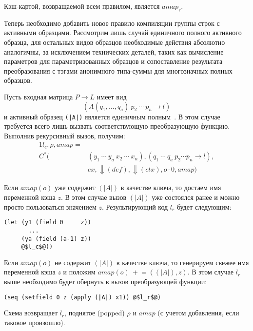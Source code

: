 Кэш-картой, возвращаемой всем правилом, является $amap_r$.

Теперь необходимо добавить новое правило компиляции группы строк с активными образцами. Рассмотрим лишь случай единичного полного активного образца, для остальных видов образцов необходимые действия абсолютно аналогичны, за исключением технических деталей, таких как вычисление параметров для параметризованных образцов и сопоставление результата преобразования с тэгами анонимного типа-суммы для многозначных полных образцов.

Пусть входная матрица $P \to L$ имеет вид 
\[
(A(q_1,\ldots,q_a)\ p_2\ \cdots\ p_n \to l)
\]
 и активный образец \lstinline{(|A|)} является единичным полным~\cite{syme2007extensible}. В этом случае требуется всего лишь вызвать соответствующую преобразующую функцию. Выполнив рекурсивный вызов, получим:
\begin{alignat*}{1}
l_c, \rho, amap = \\
C^*(&(y_1\ \cdots\ y_a\ x_2\ \cdots\ x_n), (q_1\ \cdots\ q_a\ p_2 \cdots p_n \to l),\\
&ex, \Downarrow(def), \Downarrow(ctx), o\cdot0, amap)
\end{alignat*}

Если $amap(o)$ уже содержит $(|A|)$ в качестве ключа, то достаем имя переменной кэша $z$. В этом случае вызов $(|A|)$ уже состоялся ранее и можно просто пользоваться значением $z$. Результирующий код $l_r$ будет следующим: 

\noindent
\begin{minipage}{\linewidth}
\begin{lstlisting}[language=lambda,escapechar=@] 
(let (y1 (field 0     z))
       ...
     (ya (field (a-1) z))
     @$l_c$@))
\end{lstlisting}
\end{minipage}

Если $amap(o)$ не содержит $(|A|)$ в качестве ключа, то генерируем свежее имя переменной кэша $z$ и положим $amap(o)\ +\!\!= ((|A|),z)$. В этом случае $l_r$ выше необходимо будет обернуть в вызов преобразующей функции:

\noindent
\begin{minipage}{\linewidth}
\begin{lstlisting}[language=lambda,escapechar=@] 
(seq (setfield 0 z (apply (|A|) x1)) @$l_r$@)
\end{lstlisting}
\end{minipage}

Схема возвращает $l_r$, поднятое (popped) $\rho$ и $amap$ (с учетом добавления, если таковое произошло).

